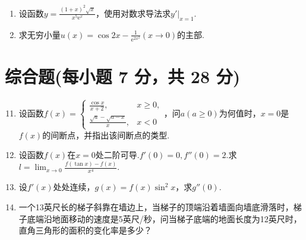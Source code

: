 \documentclass[../Main.tex]{subfiles}
\begin{document}
\begin{enumerate}
          （1）$y=f(x^{2})$；

          （2）$y=(f(x))^{2}$.
          \vspace{9em}

    \item 设函数$y=\frac{(1+x)^{2}\sqrt{x}}{x^{5}\mathrm{e}^{x}}$，使用对数求导法求$\left
              .y'\right|_{x=1}$.
          \vspace{11em}

    \item 求无穷小量$u(x)=\cos 2x-\frac{1}{\mathrm{e}^{2x^2}}(x\to0)$的主部.
          \vspace{11em}
\end{enumerate}

\section{综合题(每小题 7 分，共 28 分)}
\begin{enumerate}
    \setcounter{enumi}{10}
    \item 设函数$f(x)=
              \begin{cases}
                  \frac{\cos x}{x+2},            & x\geq0, \\
                  \frac{\sqrt{a}-\sqrt{a-x}}{x}, & x<0
              \end{cases}$，问$a(a\geq0)$为何值时，$x=0$是$f(x)$的间断点，并指出该间断点的类型.
          \vspace{12em}

    \item 设函数$f(x)$在$x=0$处二阶可导.$f'(0)=0,f''(0)=2$.求$l=\lim_{x\to0}
              \frac{f(\tan x)-f(x)}{x^{4}}$.
          \vspace{12em}

    \item 设$f'(x)$处处连续，$g(x)=f(x)\sin^{2} x$，求$g''(0)$.
          \vspace{12em}

    \item 一个13英尺长的梯子斜靠在墙边上，当梯子的顶端沿着墙面向墙底滑落时，梯子底端沿地面移动的速度是5英尺/秒，问当梯子底端的地面长度为12英尺时，直角三角形的面积的变化率是多少？
          \vspace{11em}
\end{enumerate}
\end{document}
